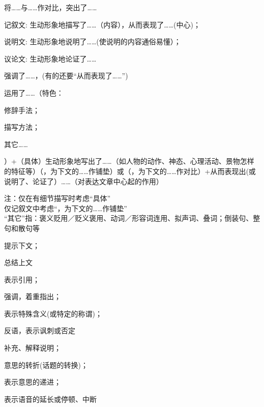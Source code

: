 将\ldots{}\ldots{}与\ldots{}\ldots{}作对比，突出了\ldots{}\ldots{}

\begin{asparadesc}
\item[记叙文:]生动形象地描写了\ldots{}\ldots{}（内容），从而表现了\ldots{}\ldots{}(中心)；\\
\item[说明文:]生动形象地说明了\ldots{}\ldots{}(使说明的内容通俗易懂）；\\
\item[议论文:]生动形象地论证了\ldots{}\ldots{}
\end{asparadesc}

强调了\ldots{}\ldots{}，(有的还要``从而表现了\ldots{}\ldots{}'')

运用了\ldots{}\ldots{}（特色：\begin{inparaenum}[(1)]\item 修辞手法；\item 描写方法；\item 其它\ldots{}\ldots{}\end{inparaenum}）+（具体）生动形象地写出了\ldots{}\ldots{}（如人物的动作、神态、心理活动、景物怎样的特征等）（，为下文的\ldots{}\ldots{}作铺垫）或（，为下文的\ldots{}\ldots{}作对比）+从而表现出(或说明了、论证了）\ldots{}\ldots{}（对表达文章中心起的作用）\par
注：仅在有细节描写时考虑``具体''\\
仅记叙文中考虑``，为下文的\ldots{}\ldots{}作铺垫''\\
``其它''指：褒义贬用／贬义褒用、动词／形容词连用、拟声词、叠词；倒装句、整句和散句等
\begin{asparaenum}[(1)]
\item 提示下文；
\item 总结上文
\end{asparaenum}

\begin{asparaenum}[(1)]
\item 表示引用；
\item 强调，着重指出；
\item 表示特殊含义(或特定的称谓)；
\item 反语，表示讽刺或否定
\end{asparaenum}

\begin{asparaenum}[(1)]
\item 补充、解释说明；
\item 意思的转折(话题的转换)；
\item 表示意思的递进；
\item 表示语音的延长或停顿、中断
\end{asparaenum}

